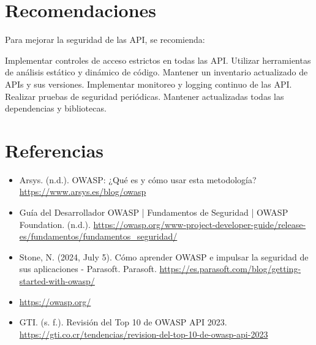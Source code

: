 \documentclass[a4paper,12pt]{article}
\begin{document}
\section{Recomendaciones}

Para mejorar la seguridad de las API, se recomienda:

Implementar controles de acceso estrictos en todas las API.
Utilizar herramientas de análisis estático y dinámico de código.
Mantener un inventario actualizado de APIs y sus versiones.
Implementar monitoreo y logging continuo de las API.
Realizar pruebas de seguridad periódicas.
Mantener actualizadas todas las dependencias y bibliotecas.

\section{Referencias}

\begin{itemize}
    \item Arsys. (n.d.). OWASP: ¿Qué es y cómo usar esta metodología? \url{https://www.arsys.es/blog/owasp}
    \item Guía del Desarrollador OWASP | Fundamentos de Seguridad | OWASP Foundation. (n.d.). \url{https://owasp.org/www-project-developer-guide/release-es/fundamentos/fundamentos_seguridad/}
    \item Stone, N. (2024, July 5). Cómo aprender OWASP e impulsar la seguridad de sus aplicaciones - Parasoft. Parasoft. \url{https://es.parasoft.com/blog/getting-started-with-owasp/}
    \item \url{https://owasp.org/}
    \item GTI. (s. f.). Revisión del Top 10 de OWASP API 2023. \\ \url{https://gti.co.cr/tendencias/revision-del-top-10-de-owasp-api-2023}
\end{itemize}
\end{document}
